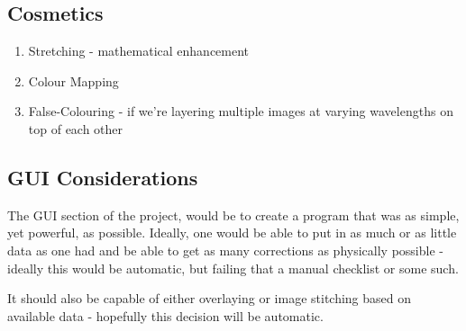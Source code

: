 \documentclass{article}
\begin{document}
\subsection{Cosmetics}
\begin{enumerate}
\item{Stretching - mathematical enhancement}
\item{Colour Mapping}
\item{False-Colouring - if we're layering multiple images at varying wavelengths on top of each other}
\end{enumerate}

\subsection{GUI Considerations}
The GUI section of the project, would be to create a program that was as simple, yet powerful, as possible. Ideally, one would be able to put in as much or as little data as one had and be able to get as many corrections as physically possible - ideally this would be automatic, but failing that a manual checklist or some such.

It should also be capable of either overlaying or image stitching based on available data - hopefully this decision will be automatic. 
\end{document}
